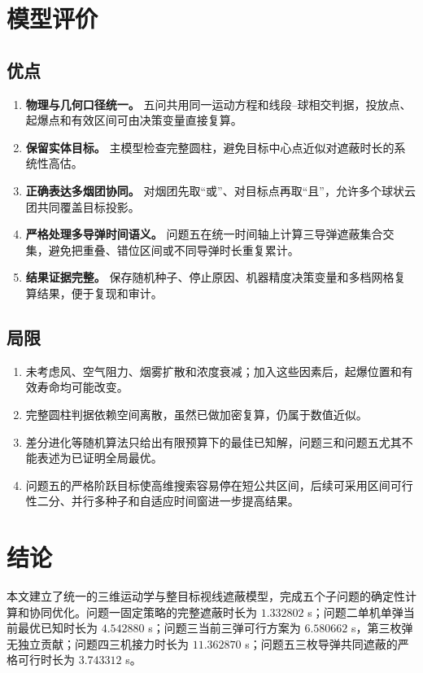 \documentclass[12pt,a4paper]{article}
\begin{document}
\section{模型评价}

\subsection{优点}

\begin{enumerate}[label=(\arabic*)]
\item \textbf{物理与几何口径统一。} 五问共用同一运动方程和线段--球相交判据，投放点、起爆点和有效区间可由决策变量直接复算。
\item \textbf{保留实体目标。} 主模型检查完整圆柱，避免目标中心点近似对遮蔽时长的系统性高估。
\item \textbf{正确表达多烟团协同。} 对烟团先取“或”、对目标点再取“且”，允许多个球状云团共同覆盖目标投影。
\item \textbf{严格处理多导弹时间语义。} 问题五在统一时间轴上计算三导弹遮蔽集合交集，避免把重叠、错位区间或不同导弹时长重复累计。
\item \textbf{结果证据完整。} 保存随机种子、停止原因、机器精度决策变量和多档网格复算结果，便于复现和审计。
\end{enumerate}

\subsection{局限}

\begin{enumerate}[label=(\arabic*)]
\item 未考虑风、空气阻力、烟雾扩散和浓度衰减；加入这些因素后，起爆位置和有效寿命均可能改变。
\item 完整圆柱判据依赖空间离散，虽然已做加密复算，仍属于数值近似。
\item 差分进化等随机算法只给出有限预算下的最佳已知解，问题三和问题五尤其不能表述为已证明全局最优。
\item 问题五的严格阶跃目标使高维搜索容易停在短公共区间，后续可采用区间可行性二分、并行多种子和自适应时间窗进一步提高结果。
\end{enumerate}

\section{结论}

本文建立了统一的三维运动学与整目标视线遮蔽模型，完成五个子问题的确定性计算和协同优化。问题一固定策略的完整遮蔽时长为 $1.332802$ s；问题二单机单弹当前最优已知时长为 $4.542880$ s；问题三当前三弹可行方案为 $6.580662$ s，第三枚弹无独立贡献；问题四三机接力时长为 $11.362870$ s；问题五三枚导弹共同遮蔽的严格可行时长为 $3.743312$ s。
\end{document}
